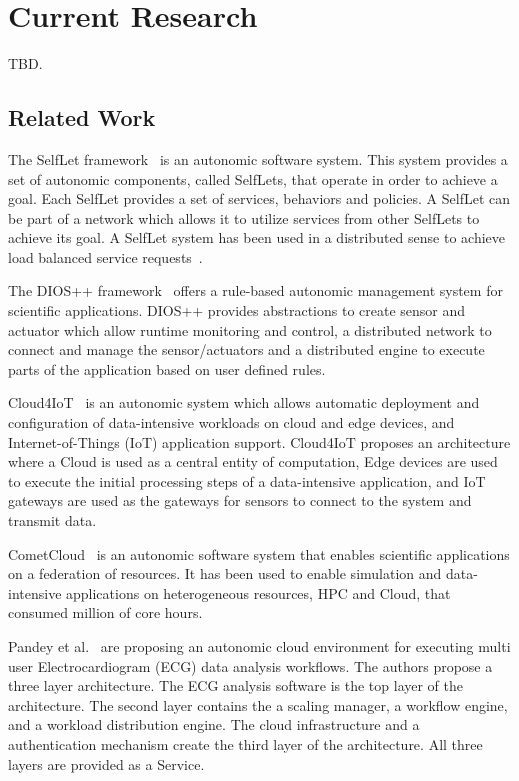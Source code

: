 \section{Current Research}

TBD.

\subsection{Related Work}

The SelfLet framework~\cite{bindelli2008building} is an autonomic software system. 
This system provides a set of autonomic components, called SelfLets, that operate 
in order to achieve a goal. Each SelfLet provides a set of services, behaviors 
and policies. A SelfLet can be part of a network which allows it to utilize 
services from other SelfLets to achieve its goal. A SelfLet system has been used 
in a distributed sense to achieve load balanced service requests~\cite{calcavecchia2010emergence}.

The DIOS++ framework~\cite{liu2003dios} offers a rule-based autonomic management 
system for scientific applications. DIOS++ provides abstractions to create sensor 
and actuator which allow runtime monitoring and control, a distributed network to 
connect and manage the sensor/actuators and a distributed engine to execute parts 
of the application based on user defined rules.

Cloud4IoT~\cite{pizzolli2016cloud4iot} is an autonomic system which allows automatic 
deployment and configuration of data-intensive workloads on cloud and edge devices, 
and Internet-of-Things (IoT) application support. Cloud4IoT proposes an architecture 
where a Cloud is used as a central entity of computation, Edge devices are used to 
execute the initial processing steps of a data-intensive application, and IoT 
gateways are used as the gateways for sensors to connect to the system and 
transmit data.

CometCloud~\cite{diazmontes2015cometcloud} is an autonomic software system that 
enables scientific applications on a federation of resources. It has been used 
to enable simulation and data-intensive applications on heterogeneous resources, 
HPC and Cloud, that consumed million of core hours.

Pandey et al.~\cite{pandey2012autonomic} are proposing an autonomic cloud 
environment for executing multi user Electrocardiogram (ECG) data analysis 
workflows. The authors propose a three layer architecture. The ECG analysis 
software is the top layer of the architecture. The second layer contains the a 
scaling manager, a workflow engine, and a workload distribution engine. The cloud 
infrastructure and a authentication mechanism create the third layer of the 
architecture. All three layers are provided as a Service.

